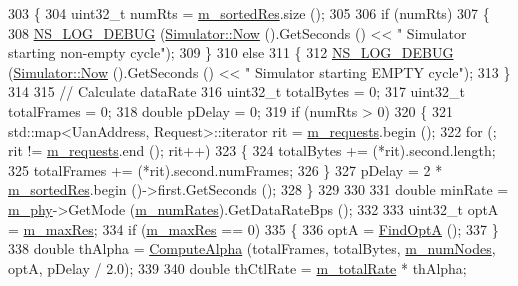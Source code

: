 \begin{DoxyCode}
303 \{
304   uint32\_t numRts = \hyperlink{classns3_1_1UanMacRcGw_afe8430ebad788663b695fe54593f5fcf}{m\_sortedRes}.size ();
305 
306   \textcolor{keywordflow}{if} (numRts)
307     \{
308       \hyperlink{group__logging_ga413f1886406d49f59a6a0a89b77b4d0a}{NS\_LOG\_DEBUG} (\hyperlink{classns3_1_1Simulator_ac3178fa975b419f7875e7105be122800}{Simulator::Now} ().GetSeconds () << \textcolor{stringliteral}{" Simulator starting
       non-empty cycle"});
309     \}
310   \textcolor{keywordflow}{else}
311     \{
312       \hyperlink{group__logging_ga413f1886406d49f59a6a0a89b77b4d0a}{NS\_LOG\_DEBUG} (\hyperlink{classns3_1_1Simulator_ac3178fa975b419f7875e7105be122800}{Simulator::Now} ().GetSeconds () << \textcolor{stringliteral}{" Simulator starting EMPTY
       cycle"});
313     \}
314 
315   \textcolor{comment}{// Calculate dataRate}
316   uint32\_t totalBytes = 0;
317   uint32\_t totalFrames = 0;
318   \textcolor{keywordtype}{double} pDelay = 0;
319   \textcolor{keywordflow}{if} (numRts > 0)
320     \{
321       std::map<UanAddress, Request>::iterator rit = \hyperlink{classns3_1_1UanMacRcGw_ace02d765d83abd8ea6513fd7813626e0}{m\_requests}.begin ();
322       \textcolor{keywordflow}{for} (; rit != \hyperlink{classns3_1_1UanMacRcGw_ace02d765d83abd8ea6513fd7813626e0}{m\_requests}.end (); rit++)
323         \{
324           totalBytes += (*rit).second.length;
325           totalFrames += (*rit).second.numFrames;
326         \}
327       pDelay = 2 * \hyperlink{classns3_1_1UanMacRcGw_afe8430ebad788663b695fe54593f5fcf}{m\_sortedRes}.begin ()->first.GetSeconds ();
328     \}
329 
330 
331   \textcolor{keywordtype}{double} minRate = \hyperlink{classns3_1_1UanMacRcGw_a68b75b833bd901fb5b26b4ee92205866}{m\_phy}->GetMode (\hyperlink{classns3_1_1UanMacRcGw_a86339396f55693d151f8c217bfcf6149}{m\_numRates}).GetDataRateBps ();
332 
333   uint32\_t optA = \hyperlink{classns3_1_1UanMacRcGw_a14fb67143992d3c9f81e27f5647045e1}{m\_maxRes};
334   \textcolor{keywordflow}{if} (\hyperlink{classns3_1_1UanMacRcGw_a14fb67143992d3c9f81e27f5647045e1}{m\_maxRes} == 0)
335     \{
336       optA = \hyperlink{classns3_1_1UanMacRcGw_acf37aa19bb4293829fec2ff254c56826}{FindOptA} ();
337     \}
338   \textcolor{keywordtype}{double} thAlpha = \hyperlink{classns3_1_1UanMacRcGw_a16f2a2f4cb6bf1bc8f3aed5c9d7d83ba}{ComputeAlpha} (totalFrames, totalBytes, \hyperlink{classns3_1_1UanMacRcGw_a00185ef8e5203de223265077a3ad2cf4}{m\_numNodes}, optA, pDelay / 
      2.0);
339 
340   \textcolor{keywordtype}{double} thCtlRate = \hyperlink{classns3_1_1UanMacRcGw_aba72112136797b9263624046a7f96b4b}{m\_totalRate} * thAlpha;

\end{DoxyCode}
